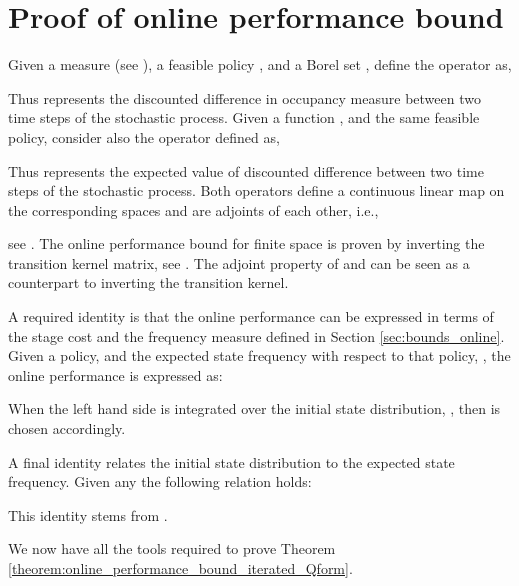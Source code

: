 \documentclass[journal]{IEEEtran}
\begin{document}
\section{Proof of online performance bound} \label{app:proof_bound_online_performance}

Given a measure  (see \cite[Definition 6.3.4]{hernandez_2012_discreteTimeMCP}), a feasible policy , and a Borel set , define the operator  as,
	
Thus  represents the discounted difference in occupancy measure between two time steps of the stochastic process. Given a function , and the same feasible policy, consider also the operator  defined as,
	
Thus  represents the expected value of discounted difference between two time steps of the stochastic process. Both operators define a continuous linear map on the corresponding spaces and are adjoints of each other, i.e.,
	
see \cite[Section 6.3]{hernandez_2012_discreteTimeMCP}. The online performance bound for finite space is proven by inverting the transition kernel matrix, see \cite[Theorem 1]{vanRoy_linApproxDP}. The adjoint property of  and  can be seen as a counterpart to inverting the transition kernel.

A required identity is that the online performance can be expressed in terms of the stage cost and the frequency measure defined in Section \ref{sec:bounds_online}. Given a policy,  and the expected state frequency with respect to that policy, , the online performance is expressed as:
	
When the left hand side is integrated over the initial state distribution, , then  is chosen accordingly.


A final identity relates the initial state distribution to the expected state frequency. Given any  the following relation holds:
	
 This identity stems from \cite[eq. (6.3.10)]{hernandez_2012_discreteTimeMCP}.

\vspace{0.2cm}

We now have all the tools required to prove Theorem \ref{theorem:online_performance_bound_iterated_Qform}.


 
\end{document}
